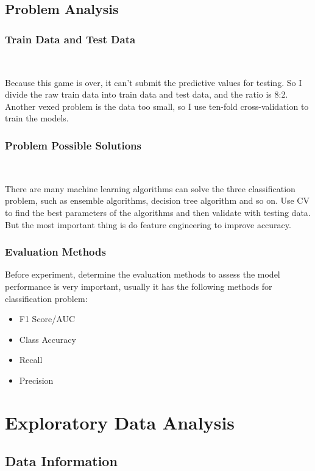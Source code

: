 \subsection{Problem Analysis}

\subsubsection{Train Data and Test Data}
\

Because this game is over, 
it can't submit the predictive values for testing. 
So I divide the raw train data into train data and test data, 
and the ratio is 8:2. 
Another vexed problem is the data too small, 
so I use ten-fold cross-validation 
to train the models.


\subsubsection{Problem Possible Solutions}
\

There are many machine learning algorithms 
can solve the three classification problem,
such as ensemble algorithms,
decision tree algorithm and so on.
Use CV to find the best parameters of the algorithms 
and then validate with testing data.
But the most important thing is 
do  feature engineering to improve accuracy. 


\subsubsection{Evaluation Methods}


Before experiment, determine the evaluation methods
to assess the model performance is very important,
usually it has the following methods
for classification problem:

\begin{itemize}
	\item F1 Score/AUC
	\item Class Accuracy
	\item Recall
	\item Precision
\end{itemize} 


\section{Exploratory Data Analysis} \label{sec-data_exploration}

\subsection{Data Information}
\

